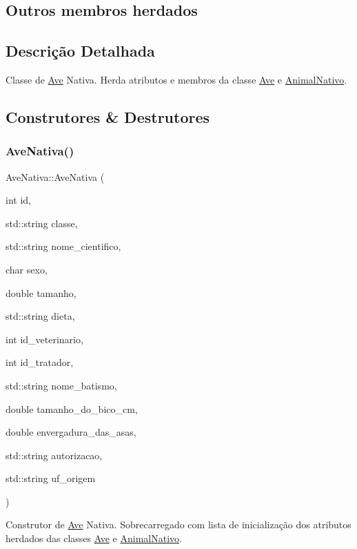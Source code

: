 \subsection*{Outros membros herdados}


\subsection{Descrição Detalhada}
Classe de \hyperlink{classAve}{Ave} Nativa. Herda atributos e membros da classe \hyperlink{classAve}{Ave} e \hyperlink{classAnimalNativo}{Animal\+Nativo}. 

\subsection{Construtores \& Destrutores}
\mbox{\label{classAveNativa_a39eb462984ca5ec684f2f10c814061d7}} 
\subsubsection{\texorpdfstring{Ave\+Nativa()}{AveNativa()}}
{\footnotesize\ttfamily Ave\+Nativa\+::\+Ave\+Nativa (\begin{DoxyParamCaption}\item[{int}]{id,  }\item[{std\+::string}]{classe,  }\item[{std\+::string}]{nome\+\_\+cientifico,  }\item[{char}]{sexo,  }\item[{double}]{tamanho,  }\item[{std\+::string}]{dieta,  }\item[{int}]{id\+\_\+veterinario,  }\item[{int}]{id\+\_\+tratador,  }\item[{std\+::string}]{nome\+\_\+batismo,  }\item[{double}]{tamanho\+\_\+do\+\_\+bico\+\_\+cm,  }\item[{double}]{envergadura\+\_\+das\+\_\+asas,  }\item[{std\+::string}]{autorizacao,  }\item[{std\+::string}]{uf\+\_\+origem }\end{DoxyParamCaption})}

Construtor de \hyperlink{classAve}{Ave} Nativa. Sobrecarregado com lista de inicialização dos atributos herdados das classes \hyperlink{classAve}{Ave} e \hyperlink{classAnimalNativo}{Animal\+Nativo}. \mbox{\label{classAveNativa_a99f26c9e02d0714a29f595bd8ecfaf5b}} 
